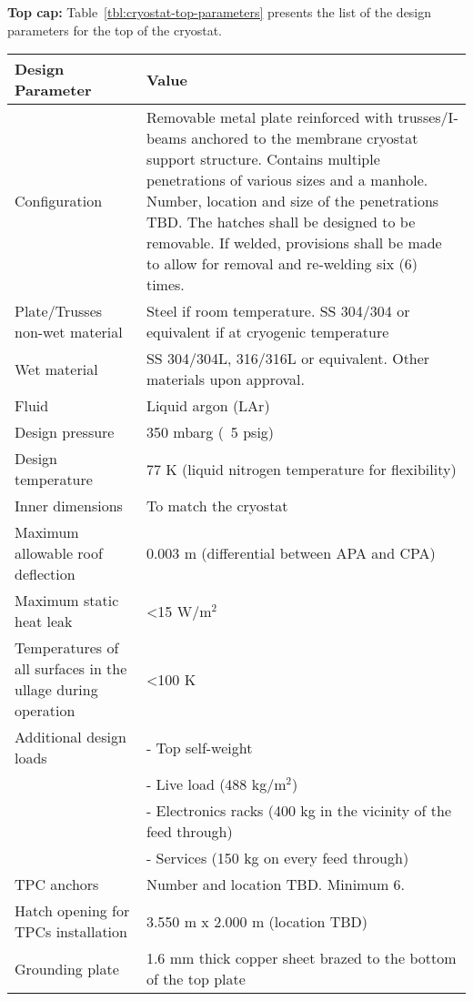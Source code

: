 \textbf{Top cap:}
%
Table~\ref{tbl:cryostat-top-parameters} presents the list of the design parameters for the top of the cryostat.
%
\begin{table}[htpb]
\centering
\begin{tabular}{|p{}|p{}|} %
\hline
 \textbf{Design Parameter} & \textbf{Value} \\ \hline
 Configuration &  Removable metal plate reinforced with trusses/I-beams anchored to the membrane cryostat support structure. Contains multiple penetrations of various sizes and a manhole. Number, location and size of the penetrations TBD. The hatches shall be designed to be removable. If welded, provisions shall be made to allow for removal and re-welding six (6) times.\\ \hline
Plate/Trusses non-wet material  &  Steel if room temperature.
SS 304/304 or equivalent if at cryogenic temperature
\\ \hline
Wet material  & SS 304/304L, 316/316L or equivalent. 
Other materials upon approval.
 \\ \hline
 Fluid & Liquid argon (LAr) \\ \hline
Design pressure  & 350 mbarg (~5 psig) \\ \hline
Design temperature  & 77 K (liquid nitrogen temperature for flexibility) \\ \hline
Inner dimensions  & To match the cryostat \\ \hline
Maximum allowable roof deflection  & 0.003 m (differential between APA and CPA) \\ \hline
Maximum static heat leak  & \textless 15 W/m$^2$  \\ \hline
 Temperatures of all surfaces in the ullage during operation & \textless 100 K \\ \hline
Additional design loads  &  -	Top self-weight \\
 & -	Live load (488 kg/m$^2$)\\
& -	Electronics racks (400 kg in the vicinity of the feed through)\\
& -	Services (150 kg on every feed through)
\\ \hline
TPC anchors  & %
Number and location TBD. Minimum 6.
 \\ \hline
 Hatch opening for TPCs installation &  3.550 m x 2.000 m (location TBD)\\ \hline %
Grounding plate  &  1.6 mm thick copper sheet brazed to the bottom of the top plate\\ \hline

\end{tabular}
\end{table}
